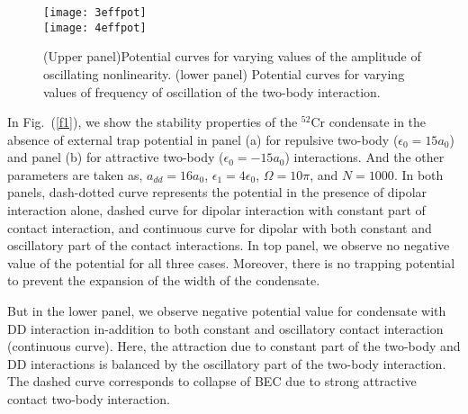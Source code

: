 \documentclass[amsmath,amssymb,article,twocolumn,superscriptaddress,showpacs,10pt]{revtex4-1}
\begin{document}
\begin{figure}[h!]
\begin{center}
\texttt{[image: 3effpot]}\\
\texttt{[image: 4effpot]}
\end{center}
\caption{(Upper panel)Potential curves for varying values of the amplitude of oscillating nonlinearity. (lower panel) Potential curves for varying values of frequency of oscillation of the two-body interaction.}
\label{f3}
\end{figure}

In Fig.~(\ref{f1}), we show the stability properties of the $^{52}$Cr condensate in the absence of external trap potential in panel (a) for repulsive two-body ($\epsilon_0=15 a_0$) and panel (b) for attractive two-body ($\epsilon_0=-15 a_0$) interactions. And the other parameters are taken as, $a_{dd}=16 a_0$, $\epsilon_1=4\epsilon_0$, $\Omega = 10\pi$, and $N=1000$. In both panels, dash-dotted curve represents the potential in the presence of dipolar interaction alone, dashed curve for dipolar interaction with constant part of contact interaction, and continuous curve for dipolar with both constant and oscillatory part of the contact interactions. In top panel, we observe no negative value of the potential for all three cases. Moreover, there is no trapping potential to prevent the expansion of the width of the condensate. 

But in the lower panel, we observe negative potential value for condensate with DD interaction in-addition to both constant and oscillatory contact interaction (continuous curve). Here, the attraction due to constant part of the two-body and DD interactions is balanced by the oscillatory part of the two-body interaction. The dashed curve corresponds to collapse of BEC due to strong attractive contact two-body interaction. 
\end{document}
